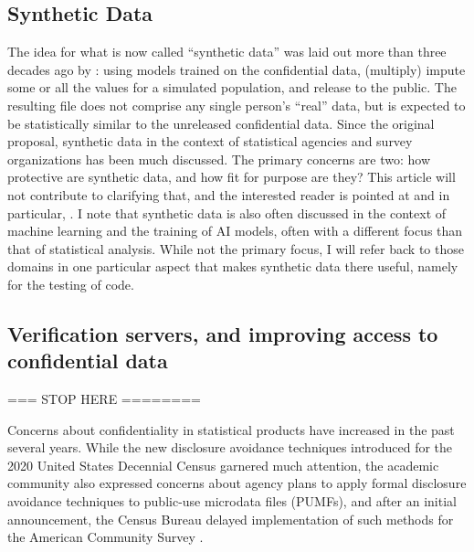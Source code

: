 \documentclass[]{hdsr}
\begin{document}

\subsection{Synthetic Data}

The idea for what is now called ``synthetic data'' was laid out more than three decades ago by \citet{rubin_discussion_1993}: using models trained on the confidential data, (multiply) impute some or all the values for a simulated population, and release to the public. The resulting file does not comprise any single person's ``real'' data, but is expected to be statistically similar to the unreleased confidential data. Since the original proposal, synthetic data in the context of statistical agencies and survey organizations has been much discussed. The primary concerns are two: how protective are synthetic data, and how fit for purpose are they? This article will not contribute to clarifying that, and the interested reader is pointed at \citet{raghunathan_synthetic_2021,reiter_synthetic_2023} and in particular, \citet{raghunathan_roadmap_2023,raghu-nber-2024}. I note that synthetic data is also often discussed in the context of machine learning and the training of AI models, often with a different focus than that of statistical analysis. While not the primary focus, I will refer back to those domains in one particular aspect that makes synthetic data there useful, namely for the testing of code. 

\subsection{Verification servers, and improving access to confidential data}
\label{sec1}
\label{intro}

=== STOP HERE ========



Concerns about confidentiality in statistical products have increased in the past several years. While the new disclosure avoidance techniques introduced for the 2020 United States Decennial Census \citep{abowd_2020_2022} garnered much attention, the academic community also expressed concerns about agency plans to apply formal disclosure avoidance techniques to public-use microdata files (PUMFs), and after an initial announcement, the Census Bureau delayed implementation of such methods for the American Community Survey \citep{daily_disclosure_2022}.
\end{document}
